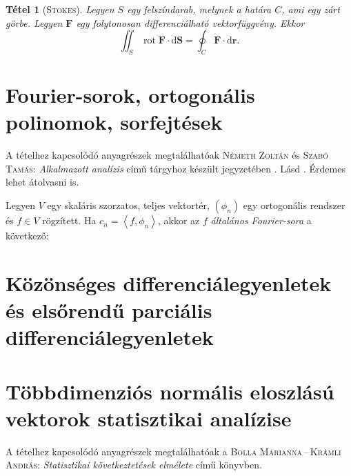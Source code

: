 \documentclass[DIV=15,appendixprefix]{scrreprt}
\newtheorem*{tetel}{Tétel}
\theoremstyle{definition}
\theoremstyle{remark}
\DeclareMathOperator{\rot}{rot}
\begin{document}
\begin{tetel}[\textsc{Stokes}]
	Legyen $ S $ egy felszíndarab, melynek a határa $ C $, ami egy zárt görbe. Legyen
	$ \mathbf{ F }$ egy folytonosan differenciálható vektorfüggvény. Ekkor
	\begin{equation*}
		\iint_{ S } \rot \mathbf{ F } \cdot \mathrm{ d } \mathbf{ S } = \oint_{ C } \mathbf{F} \cdot
		\mathrm{ d } \mathbf{r}.
	\end{equation*}
\end{tetel}
%
\section{Fourier-sorok, ortogonális polinomok, sorfejtések}
A tételhez kapcsolódó anyagrészek megtalálhatóak \textsc{Németh Zoltán} és \textsc{Szabó Tamás}: \emph{Alkalmazott analízis} című tárgyhoz készült jegyzetében \cite{SzTNZ}.
%
Lásd \cite[1.3. és 1.6.~szakaszok]{SzTNZ}. Érdemes lehet átolvasni \cite[1.4. és 1.5.~szakaszokat]{SzTNZ} is.

Legyen $ V $ egy skaláris szorzatos, teljes vektortér, $ \left( \phi_{ n } \right) $ egy
ortogonális rendszer és $ f \in V $ rögzített. Ha $ c_{ n } = \left\langle f,{} \phi_{ n }
\right\rangle $, akkor az $ f $ \emph{általános Fourier-sora} a következő:
%
\section{Közönséges differenciálegyenletek és elsőrendű parciális differenciálegyenletek}
%
\section{Többdimenziós normális eloszlású vektorok statisztikai analízise}
A tételhez kapcsolódó anyagrészek megtalálhatóak a \textsc{Bolla Marianna\,--\,Krámli András}:
\emph{Statisztikai következtetések elmélete} \cite{BollaKramli} című könyvben.
\end{document}
